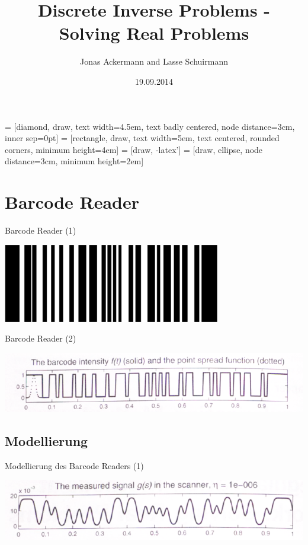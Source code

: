 \documentclass[11pt]{beamer}
\author{Jonas Ackermann and Lasse Schuirmann}
\title{Discrete Inverse Problems - Solving Real Problems}
\date{19.09.2014}
\begin{document}
 = [diamond, draw, 
    text width=4.5em, text badly centered, node distance=3cm, inner sep=0pt]
 = [rectangle, draw, 
    text width=5em, text centered, rounded corners, minimum height=4em]
 = [draw, -latex']
 = [draw, ellipse, node distance=3cm,
    minimum height=2em]

\begin{frame}
\titlepage
\end{frame}


\begin{frame}
\tableofcontents
\end{frame}


\section{Barcode Reader}
\begin{frame}{Barcode Reader (1)}
\begin{center}
\includegraphics[scale=0.5]{Barcode_example.PNG} 
\end{center}
\end{frame}


\begin{frame}{Barcode Reader (2)}
\begin{center}
\includegraphics[scale=0.5]{Barcode_f.PNG} 
\end{center}
\end{frame}


\subsection{Modellierung}
\begin{frame}{Modellierung des Barcode Readers (1)}
\begin{center}
\includegraphics[scale=0.5]{Barcode_g.PNG} 
\end{center}
\end{frame}
\end{document}
